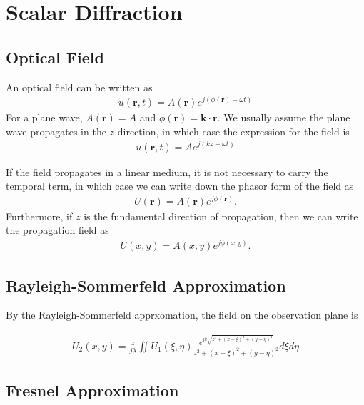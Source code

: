 \documentclass{revtex4-2}
\begin{document}
\section{Scalar Diffraction}

\subsection{Optical Field}
An optical field can be written as
\begin{align}
    u(\mathbf{r}, t) = A(\mathbf{r})e^{j(\phi(\mathbf{r}) - \omega t)}
\end{align}
For a plane wave, $A(\mathbf{r}) = A$ and $\phi(\mathbf{r}) = \mathbf{k}\cdot \mathbf{r}$. 
We usually assume the plane wave propagates in the $z$-direction, in which case the expression
for the field is
\begin{align}
    u(\mathbf{r}, t) = A e^{j(kz - \omega t)}
\end{align}

If the field propagates in a linear medium, it is not necessary to carry the temporal term, in which case we
can write down the phasor form of the field as
\begin{align}
    U(\mathbf{r}) = A(\mathbf{r})e^{j\phi(\mathbf{r})}.
\end{align}
Furthermore, if $z$ is the fundamental direction of propagation, then we can write the propagation field as
\begin{align}
    U(x, y) = A(x, y)e^{j\phi(x, y)}.
\end{align}


\subsection{Rayleigh-Sommerfeld Approximation}

By the Rayleigh-Sommerfeld apprxomation, the field on the observation plane is

\begin{align}
    U_2(x, y) = \frac{z}{j\lambda} \iint U_1(\xi, \eta) \frac{e^{jk\sqrt{z^2 + (x-\xi)^2 + (y-\eta)^2}}}
    {z^2 + (x-\xi)^2 + (y-\eta)^2} d\xi d\eta
\end{align}

\subsection{Fresnel Approximation}
\end{document}
